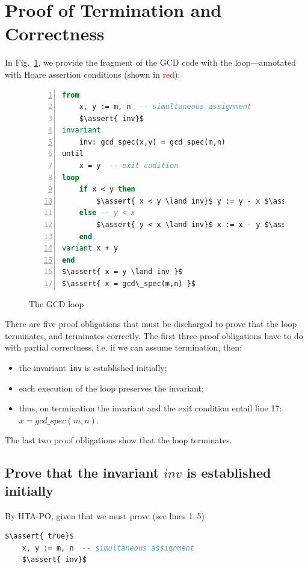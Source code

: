 \documentclass[runningheads,12pt]{article}
\newcommand{\e}[1]{\lstinline[language=eiffel]|#1|}
\def\assert#1{\textcolor{red}{ {\{} {#1} {\}}}}
\begin{document}
\section{Proof of Termination and Correctness}\label{proofs}

In Fig.~\ref{fig:gcd-loop}, we provide the fragment of the GCD code with the loop---annotated with Hoare assertion conditions (shown in \textcolor{red}{red}): 

\begin{figure}[!htb]
\begin{framed}
	\caption{The GCD loop}
\label{fig:gcd-loop}
\begin{lstlisting}[language=eiffel,numbers=left]
from
	x, y := m, n  -- simultaneous assignment
	$\assert{ inv}$
invariant 
	inv: gcd_spec(x,y) = gcd_spec(m,n)
until
	x = y  -- exit codition 
loop
	if x < y then
		$\assert{ x < y \land inv}$ y := y - x $\assert{ inv}$
	else -- y < x
		$\assert{ y < x \land inv}$ x := x - y $\assert{ inv}$
	end
variant x + y
end
$\assert{ x = y \land inv }$
$\assert{ x = gcd\_spec(m,n) }$
\end{lstlisting}
\end{framed}
\end{figure}


There are five proof obligations that must be discharged to prove that the loop terminates, and terminates correctly. The first three proof obligations have to do with partial correctness, i.e. if we can assume termination, then:

\begin{itemize}
  \item the invariant \e{inv} is established initially;
  \item each execution of the loop preserves the invariant;
  \item thus, on termination the invariant and the exit condition entail line 17: $x = gcd\_spec(m,n)$.   
\end{itemize}

The last two proof obligations show that the loop terminates. 

\subsection{Prove that the invariant $inv$ is established initially}

By HTA-PO, given that we must prove (see lines 1--5)


\begin{lstlisting}[language=eiffel]
    $\assert{ true}$
    x, y := m, n  -- simultaneous assignment
    $\assert{ inv}$
\end{lstlisting} 
\end{document}
